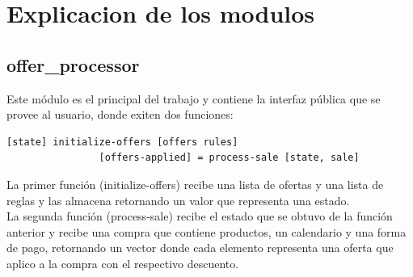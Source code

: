\documentclass[a4paper, 12pt]{article}
\begin{document}
	\section{Explicacion de los modulos}
		\subsection{offer\_processor}
			Este módulo es el principal del trabajo y contiene la interfaz pública que se provee al usuario, donde exiten dos 				funciones:\\
			\begin{lstlisting}[frame=tb, caption=firmas de la interfaz pública, label=zebra, tabsize=1]
				[state] initialize-offers [offers rules]
				[offers-applied] = process-sale [state, sale]
			\end{lstlisting}
			La primer función (initialize-offers) recibe una lista de ofertas y una lista de reglas y las almacena retornando un 				valor que representa una estado. \\
			La segunda función (process-sale) recibe el estado que se obtuvo de la función anterior y recibe una compra que 			contiene productos, un calendario y una forma de pago, retornando un vector donde cada elemento representa una oferta 				que aplico a la compra con el respectivo descuento.

		\newpage
\end{document}
